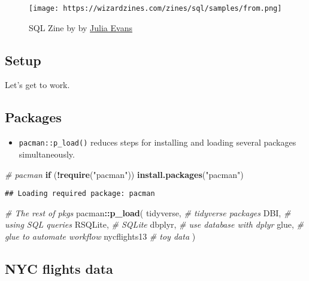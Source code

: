 \documentclass[
]{book}
\newenvironment{Shaded}{\begin{snugshade}}{\end{snugshade}}
\newcommand{\CommentTok}[1]{\textcolor[rgb]{0.56,0.35,0.01}{\textit{#1}}}
\newcommand{\ControlFlowTok}[1]{\textcolor[rgb]{0.13,0.29,0.53}{\textbf{#1}}}
\newcommand{\KeywordTok}[1]{\textcolor[rgb]{0.13,0.29,0.53}{\textbf{#1}}}
\newcommand{\NormalTok}[1]{#1}
\newcommand{\OperatorTok}[1]{\textcolor[rgb]{0.81,0.36,0.00}{\textbf{#1}}}
\newcommand{\StringTok}[1]{\textcolor[rgb]{0.31,0.60,0.02}{#1}}
\providecommand{\tightlist}{%
  \setlength{\itemsep}{0pt}\setlength{\parskip}{0pt}}
\begin{document}
\begin{figure}
\centering
\texttt{[image: https://wizardzines.com/zines/sql/samples/from.png]}
\caption{SQL Zine by by \href{https://jvns.ca/}{Julia Evans}}
\end{figure}

\hypertarget{setup-7}{%
\subsection{Setup}\label{setup-7}}

Let's get to work.

\hypertarget{packages-1}{%
\subsection{Packages}\label{packages-1}}

\begin{itemize}
\tightlist
\item
  \texttt{pacman::p\_load()} reduces steps for installing and loading several packages simultaneously.
\end{itemize}

\begin{Shaded}
\begin{Highlighting}[]
\CommentTok{\# pacman }
\ControlFlowTok{if}\NormalTok{ (}\OperatorTok{!}\KeywordTok{require}\NormalTok{(}\StringTok{"pacman"}\NormalTok{)) }\KeywordTok{install.packages}\NormalTok{(}\StringTok{"pacman"}\NormalTok{)}
\end{Highlighting}
\end{Shaded}

\begin{verbatim}
## Loading required package: pacman
\end{verbatim}

\begin{Shaded}
\begin{Highlighting}[]
\CommentTok{\# The rest of pkgs }
\NormalTok{pacman}\OperatorTok{::}\KeywordTok{p\_load}\NormalTok{(}
\NormalTok{ tidyverse, }\CommentTok{\# tidyverse packages }
\NormalTok{ DBI, }\CommentTok{\# using SQL queries}
\NormalTok{ RSQLite, }\CommentTok{\# SQLite}
\NormalTok{ dbplyr, }\CommentTok{\# use database with dplyr }
\NormalTok{ glue, }\CommentTok{\# glue to automate workflow }
\NormalTok{ nycflights13 }\CommentTok{\# toy data }
\NormalTok{)}
\end{Highlighting}
\end{Shaded}

\hypertarget{nyc-flights-data}{%
\subsection{NYC flights data}\label{nyc-flights-data}}
\end{document}
